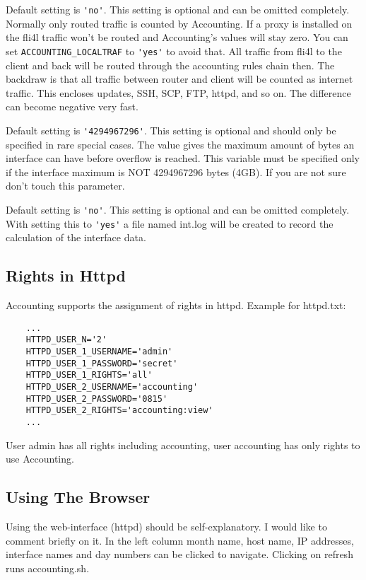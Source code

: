 \begin{description}
Default setting is \verb*?'no'?.
This setting is optional and can be omitted completely.
Normally only routed traffic is counted by Accounting. If a proxy is 
installed on the fli4l traffic won't be routed and Accounting's values will stay zero.
You can set \verb*?ACCOUNTING_LOCALTRAF? to \verb*?'yes'? to avoid that. All traffic 
from fli4l to the client and back will be routed through the accounting rules 
chain then. The backdraw is that all traffic between router and client 
will be counted as internet traffic. This encloses updates, SSH, SCP, FTP, httpd, 
and so on. The difference can become negative very fast.

Default setting is \verb*?'4294967296'?.
This setting is optional and should only be specified in rare special cases.
The value gives the maximum amount of bytes an interface can have before 
overflow is reached. This variable must be specified only if the
interface maximum is NOT 4294967296 bytes (4GB).
If you are not sure don't touch this parameter.

Default setting is \verb*?'no'?.
This setting is optional and can be omitted completely. 
With setting this to \verb*?'yes'? a file named int.log will be 
created to record the calculation of the interface data.
\end{description}

\subsection{Rights in Httpd}
Accounting supports the assignment of rights in httpd.
Example for httpd.txt:
\begin{example}
\begin{verbatim}
    ...
    HTTPD_USER_N='2'
    HTTPD_USER_1_USERNAME='admin'
    HTTPD_USER_1_PASSWORD='secret'
    HTTPD_USER_1_RIGHTS='all'
    HTTPD_USER_2_USERNAME='accounting'
    HTTPD_USER_2_PASSWORD='0815'
    HTTPD_USER_2_RIGHTS='accounting:view'
    ...
\end{verbatim}
\end{example}
User admin has all rights including accounting, user accounting has only
rights to use Accounting.

\subsection{Using The Browser}
Using the web-interface (httpd) should be self-explanatory. I would like 
to comment briefly on it.
In the left column month name, host name, IP
addresses, interface names and day numbers can be clicked to navigate.
Clicking on refresh runs accounting.sh.

